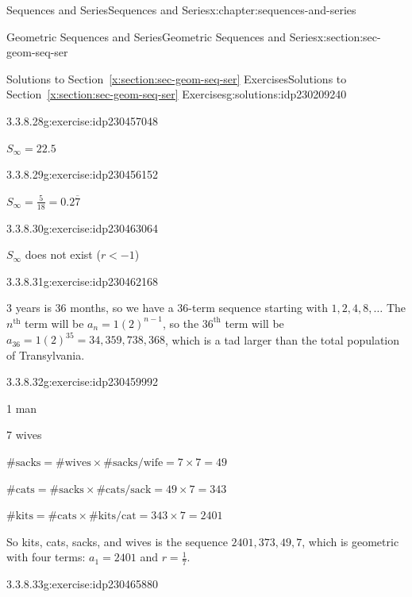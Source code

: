 \documentclass[twoside,10pt,]{book}
\newcommand{\xreffont}{\relax}
\numberwithin{equation}{section}
\newcommand{\nth}{{n^{\text{th}}}}
\newcommand{\upth}[1]{{#1^{\text{th}}}}
\newcommand{\infinity}{{\infty}}
\newcommand{\lt}{<}
\begin{document}
\begin{chapterptx}{Sequences and Series}{}{Sequences and Series}{}{}{x:chapter:sequences-and-series}
\begin{sectionptx}{Geometric Sequences and Series}{}{Geometric Sequences and Series}{}{}{x:section:sec-geom-seq-ser}
\begin{solutions-subsection}{Solutions to Section~{\xreffont\ref*{x:section:sec-geom-seq-ser}} Exercises}{}{Solutions to Section~{\xreffont\ref*{x:section:sec-geom-seq-ser}} Exercises}{}{}{g:solutions:idp230209240}
\begin{exercisegroup}
\begin{divisionsolutioneg}{3.3.8.28}{}{g:exercise:idp230457048}%
\par\smallskip%
\noindent\hypertarget{g:solution:idp230463192-main}{}\(S_\infinity  = 22.5\)\end{divisionsolutioneg}%
\begin{divisionsolutioneg}{3.3.8.29}{}{g:exercise:idp230456152}%
\par\smallskip%
\noindent\hypertarget{g:solution:idp230461784-main}{}\(S_\infinity = \frac{5}{{18}} = 0.2\overline 7\)\end{divisionsolutioneg}%
\begin{divisionsolutioneg}{3.3.8.30}{}{g:exercise:idp230463064}%
\par\smallskip%
\noindent\hypertarget{g:solution:idp230462680-main}{}\(S_\infinity\) does not exist (\(r \lt -1\))\end{divisionsolutioneg}%
\end{exercisegroup}
\par\medskip\noindent
\begin{divisionsolution}{3.3.8.31}{}{g:exercise:idp230462168}%
\par\smallskip%
\noindent\hypertarget{g:solution:idp230456536-main}{}3 years is 36 months, so we have a 36-term sequence starting with \(1, 2, 4, 8, \ldots\)  The \(\nth{}\) term will be \({a_n} = 1{\left( 2 \right)^{n - 1}}\), so the \(\upth{36}\) term will be \({a_{36}} = 1{\left( 2 \right)^{35}} = 34,359,738,368\), which is a tad larger than the total population of Transylvania.\end{divisionsolution}%
\begin{divisionsolution}{3.3.8.32}{}{g:exercise:idp230459992}%
\par\smallskip%
\noindent\hypertarget{g:solution:idp230460120-main}{}1 man%
\par
7 wives%
\par
\(\# \text{sacks} = \#\text{wives} \times \# \text{sacks/wife} = 7 \times 7 = 49\)%
\par
\(\# \text{cats} = \#\text{sacks} \times \# \text{cats/sack} = 49 \times 7 = 343\)%
\par
\(\# \text{kits} = \#\text{cats} \times \# \text{kits/cat} = 343 \times 7 = 2401\)%
\par
So kits, cats, sacks, and wives is the sequence \(2401, 373, 49, 7\), which is geometric with four terms:  \(a_1 = 2401\) and \(r = \frac{1}{7}\).%
\end{divisionsolution}%
\begin{divisionsolution}{3.3.8.33}{}{g:exercise:idp230465880}%

\end{divisionsolution}
\end{solutions-subsection}
\end{sectionptx}
\end{chapterptx}
\end{document}
